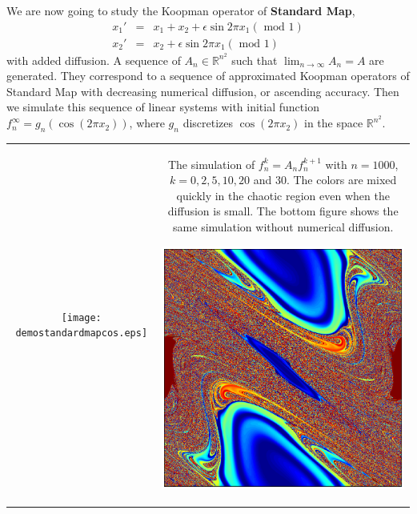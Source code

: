 \documentclass[landscape,a0b,final]{a0poster}
\newenvironment{poster}{
  \begin{center}
  \begin{minipage}[c]{0.98\textwidth}
}{
  \end{minipage} 
  \end{center}
}
\newenvironment{pcolumn}[1]{
  \begin{minipage}{#1\textwidth}
  \begin{center}
}{
  \end{center}
  \end{minipage}
}
\begin{document}
\begin{poster}
\begin{center}
\begin{pcolumn}{0.32}
{We are now going to study the Koopman operator of \textbf{Standard Map},
  \begin{eqnarray}
               x_1' &=&  x_1+x_2 +\epsilon \sin{2 \pi x_1} (\mbox{ mod } 1) \nonumber\\
               x_2' &=&  x_2 +\epsilon \sin{2 \pi x_1}     (\mbox{ mod } 1)
  \end{eqnarray}
with added diffusion. A sequence of $A_n \in \mathbb{R}^{n^2}$ such that $\lim_{n \rightarrow \infty} A_n = A$ are generated. They correspond to a sequence of approximated Koopman operators of Standard Map with decreasing numerical diffusion, or ascending accuracy. Then we simulate this sequence of linear systems with initial function  $f_n^{\infty} = g_n(\cos(2 \pi x_2))$, where $g_n$ discretizes $\cos(2 \pi x_2)$ in the space $\mathbb{R}^{n^2}$.



\begin{tabular}{c|c}
   \texttt{[image: demostandardmapcos.eps]}&

   \begin{minipage}[b]{0.33\hsize}
    The simulation of $f_n^k = A_n f_n^{k+1}$ with $n = 1000$, $k = 0,2,5,10,20$ and $30$. The colors are mixed quickly in the chaotic region even when the diffusion is small. The bottom figure shows the same simulation without numerical diffusion.    
    
 \centerline{\includegraphics[scale=0.6,angle=90]{standardmapsimuexact2.eps}}
   \end{minipage} 
\end{tabular}

}
\end{pcolumn}
\end{center}
\end{poster}
\end{document}
